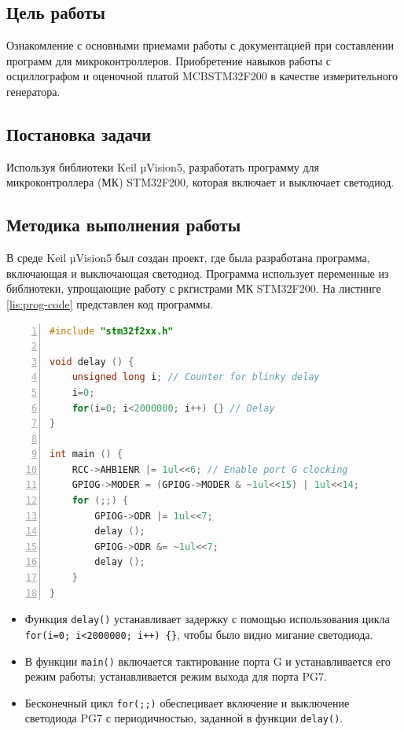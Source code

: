 \subsection*{Цель работы}
Ознакомление с основными приемами работы с документацией при
составлении программ для микроконтроллеров. Приобретение навыков работы с
осциллографом и оценочной платой MCBSTM32F200 в качестве измерительного
генератора.

\subsection*{Постановка задачи}
Используя библиотеки Keil µVision5, разработать
программу для микроконтроллера (МК) STM32F200, которая включает и выключает
светодиод.

\subsection*{Методика выполнения работы}

В среде Keil µVision5 был создан проект, где была разработана программа, включающая и выключающая
светодиод. Программа использует переменные из библиотеки, упрощающие работу с ркгистрами МК STM32F200. На листинге \ref{lis:prog-code} представлен код программы.

\begin{lstlisting}[language=C, caption={Прогамма упавления светодиодом.}, label={lis:prog-code}, numbers=left]
#include "stm32f2xx.h"

void delay () {
    unsigned long i; // Counter for blinky delay
    i=0;
    for(i=0; i<2000000; i++) {} // Delay
}

int main () {
    RCC->AHB1ENR |= 1ul<<6; // Enable port G clocking
    GPIOG->MODER = (GPIOG->MODER & ~1ul<<15) | 1ul<<14;
    for (;;) {
        GPIOG->ODR |= 1ul<<7;
        delay ();
        GPIOG->ODR &= ~1ul<<7;
        delay ();
    }
}
\end{lstlisting}

\begin{itemize}
    \item Функция \verb|delay()| устанавливает задержку с помощью использования цикла \verb|for(i=0; i<2000000; i++) {}|, чтобы было видно мигание светодиода.
    \item В функции \verb|main()| включается тактирование порта G и устанавливается его режим работы; устанавливается режим выхода для порта PG7.
    \item Бесконечный цикл \verb|for(;;)| обеспецивает включение и выключение светодиода PG7 с периодичностью, заданной в функции \verb|delay()|.
\end{itemize}

